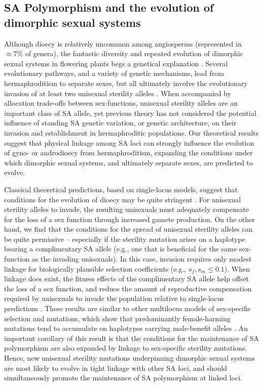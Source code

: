 \documentclass{article}
\begin{document}
\subsection*{SA Polymorphism and the evolution of dimorphic sexual systems}

Although dioecy is relatively uncommon among angiosperms (represented in $\approx 7\%$ of genera), the fantastic diversity and repeated evolution of dimorphic sexual systems in flowering plants begs a genetical explanation \citep{Renner2014,KaferPannell2017}. Several evolutionary pathways, and a variety of genetic mechanisms, lead from hermaphroditism to separate sexes, but all ultimately involve the evolutionary invasion of at least two unisexual sterility alleles \citep{Charlesworth1978a,Charlesworth1978b,Renner2014,Ashman2015}. When accompanied by allocation trade-offs between sex-functions, unisexual sterility alleles are an important class of SA allele, yet previous theory has not considered the potential influence of standing SA genetic variation, or genetic architecture, on their invasion and establishment in hermaphroditic populations. Our theoretical results suggest that physical linkage among SA loci can strongly influence the evolution of gyno- or androdioecy from hermaphroditism, expanding the conditions under which dimorphic sexual systems, and ultimately separate sexes, are predicted to evolve. 

Classical theoretical predictions, based on single-locus models, suggest that conditions for the evolution of dioecy may be quite stringent \citep{Lloyd1975,Lloyd1976,Charlesworth1978a,KaferPannell2017}. For unisexual sterility alleles to invade, the resulting unisexuals must adequately compensate for the loss of a sex function through increased gamete production. On the other hand, we find that the conditions for the spread of unisexual sterility alleles can be quite permissive -- especially if the sterility mutation arises on a haplotype bearing a complimentary SA allele (e.g., one that is beneficial for the same sex-function as the invading unisexuals). In this case, invasion requires only modest linkage for biologically plausible selection coefficients (e.g., $s_f,s_m \leq 0.1$). When linkage does exist, the fitness effects of the complimentary SA allele help offset the loss of a sex function, and reduce the amount of reproductive compensation required by unisexuals to invade the population relative to single-locus predictions \citep{Charlesworth1978a}. These results are similar to other multilocus models of sex-specific selection and mutations, which show that predominantly female-harming mutations tend to accumulate on haplotypes carrying male-benefit alleles \citep{ConnallonJordan2016}. An important corollary of this result is that the conditions for the maintenance of SA polymorphism are also expanded by linkage to sex-specific sterility mutations. Hence, new unisexual sterility mutations underpinning dimorphic sexual systems are most likely to evolve in tight linkage with other SA loci, and should simultaneously promote the maintenance of SA polymorphism at linked loci. 
\end{document}

